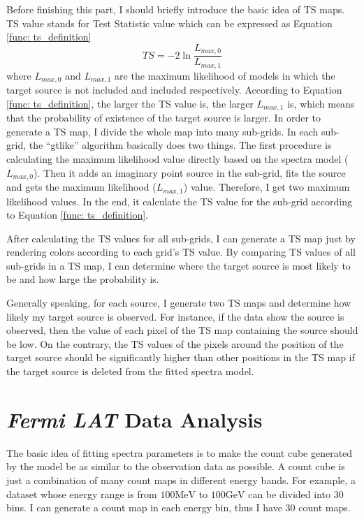 \documentclass[12pt]{report}
\begin{document}
      Before finishing this part, I should briefly introduce the basic idea of TS maps. 
      TS value stands for Test Statistic value which can be expressed as Equation 
      \ref{func: ts_definition} 
      \begin{equation}
        TS = -2 \ln{\frac{L_{max,0}}{L_{max,1}}}
        \label{func: ts_definition}
      \end{equation}
      where $L_{max,0}$ and $L_{max,1}$ are the maximum likelihood of models in which the 
      target source is not included and included respectively. According to Equation 
      \ref{func: ts_definition}, the larger the TS value is, the larger $L_{max, 1}$ is, 
      which means that the probability of existence of the target source is larger. 
      In order to generate a TS map, I divide the whole map into many sub-grids. In each 
      sub-grid, the ``gtlike'' algorithm basically does two things. The first procedure is 
      calculating the maximum likelihood value directly based on the spectra model 
      ($L_{max,0}$). Then it adds an imaginary point source in the sub-grid, fits the source 
      and gets the maximum likelihood ($L_{max, 1}$) value. Therefore, I get two 
      maximum likelihood values. In the end, it calculate the TS value for the 
      sub-grid according to Equation \ref{func: ts_definition}. 

      After calculating the TS values for all sub-grids, I can generate a TS map just by 
      rendering colors according to each grid's TS value. By comparing TS values of 
      all sub-grids in a TS map, I can determine where the target source is most likely to 
      be and how large the probability is. 
      
      Generally speaking, for each source, I generate two TS maps and determine how likely 
      my target source is observed. For instance, if the data show the source is observed, 
      then the value of each pixel of the TS map containing the source should be low. 
      On the contrary, the TS values of the pixels around the position of the target 
      source should be significantly higher than other positions in the TS map if the target 
      source is deleted from the fitted spectra model.
       
  \section{\textit{Fermi LAT} Data Analysis}
    The basic idea of fitting spectra parameters is to make the count cube generated by 
    the model be as similar to the observation data as possible. A count cube is just a 
    combination of many count maps in different energy bands. For example, a dataset whose 
    energy range is from $100\mbox{MeV}$ to $100\mbox{GeV}$ can be divided into 30 bins. 
    I can generate a count map in each energy bin, thus I have 30 count maps.
    
\end{document}
